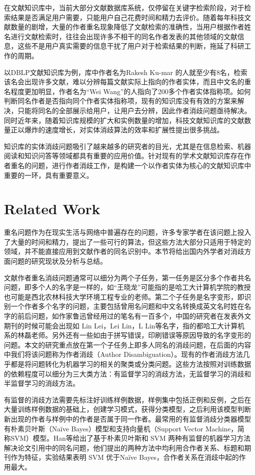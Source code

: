 \documentclass[sigchi]{acmart}
\begin{document}
在文献知识库中，当前大部分文献数据库系统，仅停留在关键字检索阶段，对于检索结果是否满足用户需要，只能用户自己花费时间和精力去评价。随着每年科技文献数量的剧增，大量的作者重名现象降低了文献检索的准确性，当用户根据作者姓名进行文献检索时，往往会出现许多不相干的同名作者发表的其他领域的文献信息，这些不是用户真实需要的信息干扰了用户对于检索结果的判断，拖延了科研工作的周期。

以DBLP文献知识库为例，库中作者名为Rakesh Ku-mar 的人就至少有8名，检索该名会出现许多文献，难以分辨每篇文献实际上指向的作者实体，而且中文名的重名程度更加明显，作者名为“Wei Wang”的人指向了200多个作者实体指称项。如何判断同名作者是否指向同个作者实体指称项，现有的知识库没有有效的方案来解决，只能将同名的全部展示给用户，让用户去分辨，因此作者消歧问题亟待解决。同时近年来，随着知识库规模的扩大和实例数量的增加，科技文献知识库的文献数量正以爆炸的速度增长，对实体消歧算法的效率和扩展性提出很多挑战。

知识库的实体消歧问题吸引了越来越多的研究者的目光，尤其是在信息检索、机器阅读和知识问答等领域都具有重要的应用价值。针对现有的学术文献知识库存在作者重名的问题，进行作者消歧工作，是构建一个以作者实体为核心的文献知识库中重要的一环，具有重要意义。


\section{Related Work}
重名问题作为在现实生活与网络中普遍存在的问题，许多专家学者在该问题上投入了大量的时间和精力，提出了一些可行的算法，但这些方法大部分只适用于特定的领域，并不能直接应用到文献作者的同名识别中。本节将给出国内外学者对消歧方面问题的研究现状及分析与总结。

文献作者重名消歧问题通常可以细分为两个子任务，第一任务是区分多个作者共名问题，即多个人的名字是一样的，如“王晓龙”可能指的是哈工大计算机学院的教授也可能是西北农林科技大学环境工程专业的老师。第二个子任务是名字变形，即识别一个作者多个名字的问题，主要包括曾用名问题和中文名转换成英文名时姓在名字的前后问题，如作家鲁迅曾经用过的笔名有一百多个，中国的研究者在发表外文期刊的时候可能会出现如 Lin Lei，Lei Lin，L Lin等名字，指的都哈工大计算机系的林磊老师。另外还有一些如由于拼写错误，印刷错误等原因导致的名字变形的问题。本文的研究重点放在第一个子任务上即多人同名的消歧问题，在后面的内容中我们将该问题称为作者消歧（Author Disambiguation）。现有的作者消歧方法几乎都是将问题转化为机器学习的相关的聚类或分类问题。这些方法按照对训练数据的依赖程度可以细分为三大类方法：有监督学习的消歧方法，无监督学习的消歧和半监督学习的消歧方法。

有监督的消歧方法需要先标注好训练样例数据，样例集中包括正例和反例，之后在大量训练样例数据的基础上，创建学习模式，获得分类模型，之后利用该模型判断新出现的作者与样例中的作者是否属于同一作者。最常用的有监督消歧分类器模型有朴素贝叶斯（Naïve Bayes）模型和支持向量机（Support Vector Machine，简称SVM）模型。Han\cite{HanGiles-461}等给出了基于朴素贝叶斯和 SVM 两种有监督的机器学习方法解决论文引用中的同名问题，他们提出的两种方法中均利用合作者关系、标题和期刊作为特征，实验结果表明 SVM 优于Naïve Bayes，合作者关系在消歧中起的作用最大。
\end{document}
